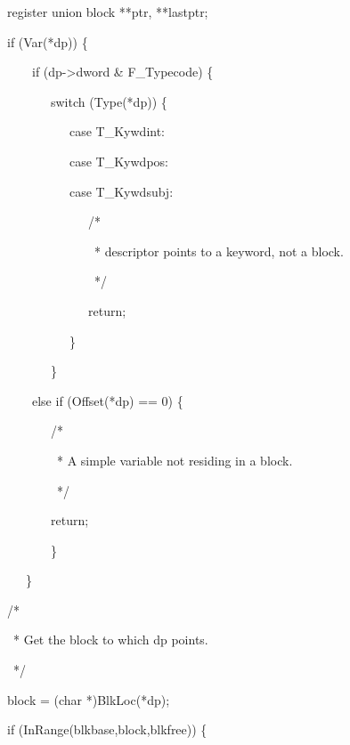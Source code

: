 {\ttfamily\mdseries
\ \ \ register union block **ptr, **lastptr;
}


\bigskip

{\ttfamily\mdseries
\ \ \ if (Var(*dp)) \{
}

{\ttfamily\mdseries
\ \ \ \ \ \ \ if (dp-{\textgreater}dword \& F\_Typecode) \{
}

{\ttfamily\mdseries
\ \ \ \ \ \ \ \ \ \ switch (Type(*dp)) \{
}

{\ttfamily\mdseries
\ \ \ \ \ \ \ \ \ \ \ \ \ case T\_Kywdint:
}

{\ttfamily\mdseries
\ \ \ \ \ \ \ \ \ \ \ \ \ case T\_Kywdpos:
}

{\ttfamily\mdseries
\ \ \ \ \ \ \ \ \ \ \ \ \ case T\_Kywdsubj:
}

{\ttfamily\mdseries
\ \ \ \ \ \ \ \ \ \ \ \ \ \ \ \ /*
}

{\ttfamily\mdseries
\ \ \ \ \ \ \ \ \ \ \ \ \ \ \ \ \ * descriptor points to a keyword, not a block.
}

{\ttfamily\mdseries
\ \ \ \ \ \ \ \ \ \ \ \ \ \ \ \ \ */
}

{\ttfamily\mdseries
\ \ \ \ \ \ \ \ \ \ \ \ \ \ \ \ return;
}

{\ttfamily\mdseries
\ \ \ \ \ \ \ \ \ \ \ \ \ \}
}

{\ttfamily\mdseries
\ \ \ \ \ \ \ \ \ \ \}
}

{\ttfamily\mdseries
\ \ \ \ \ \ \ else if (Offset(*dp) == 0) \{
}

{\ttfamily\mdseries
\ \ \ \ \ \ \ \ \ \ /*
}

{\ttfamily\mdseries
\ \ \ \ \ \ \ \ \ \ \ * A simple variable not residing in a block. \ \ \ \ \ \ }

{\ttfamily\mdseries
\ \ \ \ \ \ \ \ \ \ \ */
}

{\ttfamily\mdseries
\ \ \ \ \ \ \ \ \ \ return;
}

{\ttfamily\mdseries
\ \ \ \ \ \ \ \ \ \ \}
}

{\ttfamily\mdseries
\ \ \ \ \ \ \}
}


\bigskip

{\ttfamily\mdseries
\ \ \ /*
}

{\ttfamily\mdseries
\ \ \ \ * Get the block to which dp points.
}

{\ttfamily\mdseries
\ \ \ \ */
}

{\ttfamily\mdseries
\ \ \ block = (char *)BlkLoc(*dp);
}


\bigskip

{\ttfamily\mdseries
\ \ \ if (InRange(blkbase,block,blkfree)) \{
}

